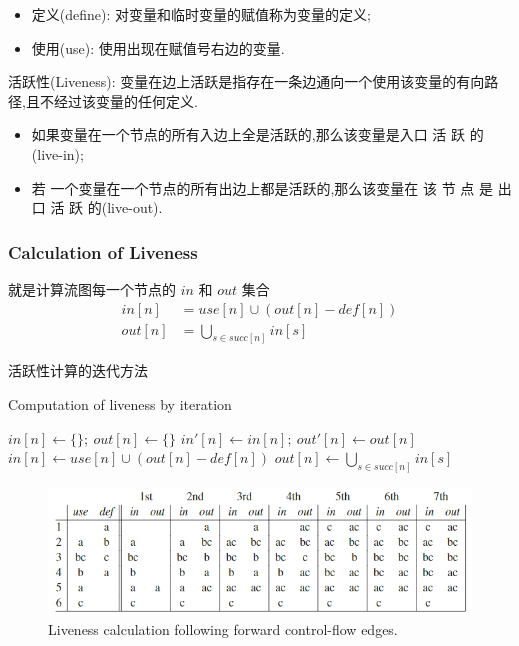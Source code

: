 \begin{itemize}
    \item 定义(define): 对变量和临时变量的赋值称为变量的定义;
    \item 使用(use): 使用出现在赋值号右边的变量.
\end{itemize}

活跃性(Liveness): 变量在边上活跃是指存在一条边通向一个使用该变量的有向路径,且不经过该变量的任何定义.
\begin{itemize}
    \item 如果变量在一个节点的所有入边上全是活跃的,那么该变量是入口 活 跃 的 (live-in); 
    \item 若 一个变量在一个节点的所有出边上都是活跃的,那么该变量在 该 节 点 是 出 口 活 跃 的(live-out).
\end{itemize}

\subsubsection{Calculation of Liveness}
就是计算流图每一个节点的 $in$ 和 $out$ 集合
\begin{equation}
    \begin{split}
        in[n]&=use[n]\cup (out[n]-def[n])\\
        out[n]&=\bigcup_{s\in succ[n]}in[s]
    \end{split}\label{eq:liveness}
\end{equation}

活跃性计算的迭代方法
\begin{algorithm}[H]
    \caption{Computation of liveness by iteration}
    \label{algo:liveness}
    \begin{algorithmic}
            \State $in[n]\leftarrow \{\};\ out[n]\leftarrow \{\}$
        \EndFor
        \Repeat
                \State $in'[n]\leftarrow in[n];\ out'[n]\leftarrow out[n]$
                \State $in[n]\leftarrow use[n] \cup (out[n] - def[n])$
                \State $\displaystyle out[n]\leftarrow \bigcup_{s\in succ[n]}in[s]$
            \EndFor
    \end{algorithmic}
\end{algorithm}

\begin{figure}[!htb]
    \centering
    \includegraphics[height=0.14\textwidth]{pic/CP10/Liveness calculation following forward control-flow edges.}
    \caption{Liveness calculation following forward control-flow edges.}
\end{figure}

